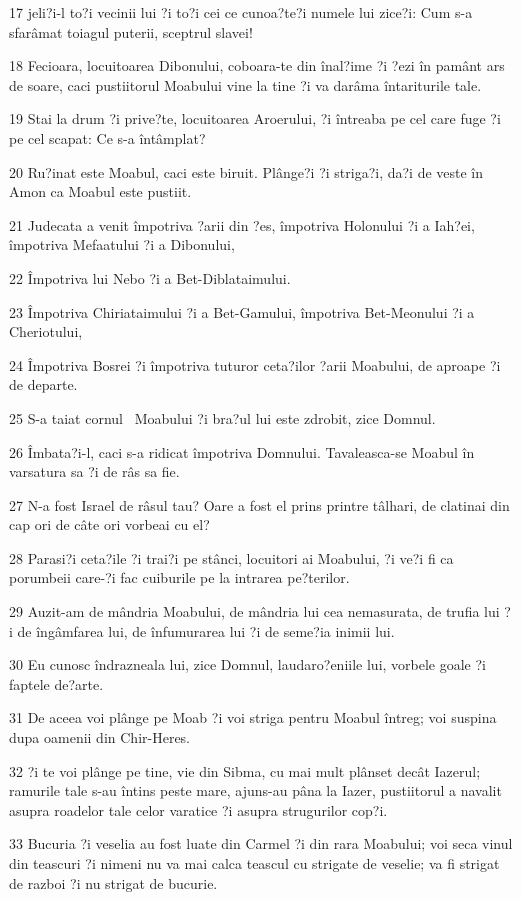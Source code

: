 \par 17 jeli?i-l to?i vecinii lui ?i to?i cei ce cunoa?te?i numele lui zice?i: Cum s-a sfarâmat toiagul puterii, sceptrul slavei!
\par 18 Fecioara, locuitoarea Dibonului, coboara-te din înal?ime ?i ?ezi în pamânt ars de soare, caci pustiitorul Moabului vine la tine ?i va darâma întariturile tale.
\par 19 Stai la drum ?i prive?te, locuitoarea Aroerului, ?i întreaba pe cel care fuge ?i pe cel scapat: Ce s-a întâmplat?
\par 20 Ru?inat este Moabul, caci este biruit. Plânge?i ?i striga?i, da?i de veste în Amon ca Moabul este pustiit.
\par 21 Judecata a venit împotriva ?arii din ?es, împotriva Holonului ?i a Iah?ei, împotriva Mefaatului ?i a Dibonului,
\par 22 Împotriva lui Nebo ?i a Bet-Diblataimului.
\par 23 Împotriva Chiriataimului ?i a Bet-Gamului, împotriva Bet-Meonului ?i a Cheriotului,
\par 24 Împotriva Bosrei ?i împotriva tuturor ceta?ilor ?arii Moabului, de aproape ?i de departe.
\par 25 S-a taiat cornul  Moabului ?i bra?ul lui este zdrobit, zice Domnul.
\par 26 Îmbata?i-l, caci s-a ridicat împotriva Domnului. Tavaleasca-se Moabul în varsatura sa ?i de râs sa fie.
\par 27 N-a fost Israel de râsul tau? Oare a fost el prins printre tâlhari, de clatinai din cap ori de câte ori vorbeai cu el?
\par 28 Parasi?i ceta?ile ?i trai?i pe stânci, locuitori ai Moabului, ?i ve?i fi ca porumbeii care-?i fac cuiburile pe la intrarea pe?terilor.
\par 29 Auzit-am de mândria Moabului, de mândria lui cea nemasurata, de trufia lui ?i de îngâmfarea lui, de înfumurarea lui ?i de seme?ia inimii lui.
\par 30 Eu cunosc îndrazneala lui, zice Domnul, laudaro?eniile lui, vorbele goale ?i faptele de?arte.
\par 31 De aceea voi plânge pe Moab ?i voi striga pentru Moabul întreg; voi suspina dupa oamenii din Chir-Heres.
\par 32 ?i te voi plânge pe tine, vie din Sibma, cu mai mult plânset decât Iazerul; ramurile tale s-au întins peste mare, ajuns-au pâna la Iazer, pustiitorul a navalit asupra roadelor tale celor varatice ?i asupra strugurilor cop?i.
\par 33 Bucuria ?i veselia au fost luate din Carmel ?i din rara Moabului; voi seca vinul din teascuri ?i nimeni nu va mai calca teascul cu strigate de veselie; va fi strigat de razboi ?i nu strigat de bucurie.
